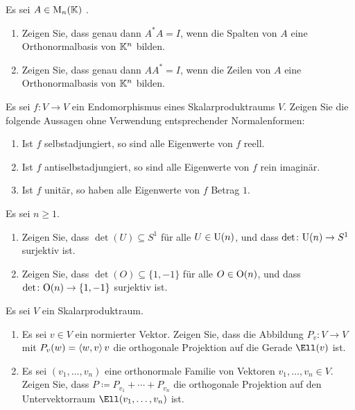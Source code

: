 \documentclass[a4paper, 10pt]{scrartcl}
\begin{document}
\begin{question}
  Es sei $A \in \mathrm{M}_n(\mathbb{K})$ .
  \begin{enumerate}[leftmargin=*]
    \item
      Zeigen Sie, dass genau dann $A^* A = I$, wenn die Spalten von $A$ eine Orthonormalbasis von $\mathbb{K}^n$ bilden.
    \item
      Zeigen Sie, dass genau dann $A A^* = I$, wenn die Zeilen von $A$ eine Orthonormalbasis von $\mathbb{K}^n$ bilden.
  \end{enumerate}
\end{question}


\begin{question}
  Es sei $f \colon V \to V$ ein Endomorphismus eines Skalarproduktraums $V$.
  Zeigen Sie die folgende Aussagen ohne Verwendung entsprechender Normalenformen:
  \begin{enumerate}[leftmargin=*]
    \item
      Ist $f$ selbstadjungiert, so sind alle Eigenwerte von $f$ reell.
    \item
      Ist $f$ antiselbstadjungiert, so sind alle Eigenwerte von $f$ rein imaginär.
    \item
      Ist $f$ unitär, so haben alle Eigenwerte von $f$ Betrag $1$.
  \end{enumerate}
\end{question}


\begin{question}
  Es sei $n \geq 1$.
  \begin{enumerate}[leftmargin=*]
    \item
      Zeigen Sie, dass $\det(U) \subseteq S^1$ für alle $U \in \mathrm{U}(n)$, und dass $\det \colon \mathrm{U}(n) \to S^1$ surjektiv ist.
    \item
      Zeigen Sie, dass $\det(O) \subseteq \{1,-1\}$ für alle $O \in \mathrm{O}(n)$, und dass $\det \colon \mathrm{O}(n) \to \{1,-1\}$ surjektiv ist.
  \end{enumerate}
\end{question}


\begin{question}
  Es sei $V$ ein Skalarproduktraum.
  \begin{enumerate}[leftmargin=*]
    \item
      Es sei $v \in V$ ein normierter Vektor.
      Zeigen Sie, dass die Abbildung $P_v \colon V \to V$ mit $P_v(w) = \left\langle w,v \right\rangle v$ die orthogonale Projektion auf die Gerade $\Ell(v)$ ist.
    \item
      Es sei $(v_1, \dotsc, v_n)$ eine orthonormale Familie von Vektoren $v_1, \dotsc, v_n \in V$.
      Zeigen Sie, dass $P \coloneqq P_{v_1} + \dotsb + P_{v_n}$ die orthogonale Projektion auf den Untervektorraum $\Ell(v_1, \dotsc, v_n)$ ist.
  \end{enumerate}
\end{question}
\end{document}
